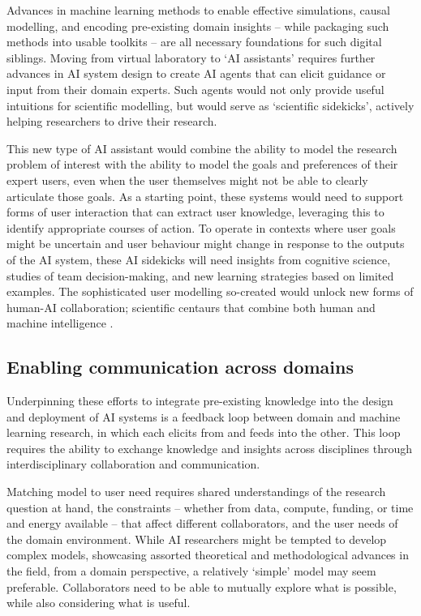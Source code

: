 Advances in machine learning methods to enable effective simulations,
causal modelling, and encoding pre-existing domain insights -- while
packaging such methods into usable toolkits -- are all necessary
foundations for such digital siblings. Moving from virtual laboratory to
`AI assistants' requires further advances in AI system design to create
AI agents that can elicit guidance or input from their domain experts.
Such agents would not only provide useful intuitions for scientific
modelling, but would serve as `scientific sidekicks', actively helping
researchers to drive their research.

This new type of AI assistant would combine the ability to model the
research problem of interest with the ability to model the goals and
preferences of their expert users, even when the user themselves might
not be able to clearly articulate those goals. As a starting point,
these systems would need to support forms of user interaction that can
extract user knowledge, leveraging this to identify appropriate courses
of action. To operate in contexts where user goals might be uncertain
and user behaviour might change in response to the outputs of the AI
system, these AI sidekicks will need insights from cognitive science,
studies of team decision-making, and new learning strategies based on
limited examples. The sophisticated user modelling so-created would
unlock new forms of human-AI collaboration; scientific centaurs that
combine both human and machine intelligence \cite{Celikok-best22}.

\subsection{Enabling communication across
domains}\label{enabling-communication-across-domains}

Underpinning these efforts to integrate pre-existing knowledge into the
design and deployment of AI systems is a feedback loop between domain
and machine learning research, in which each elicits from and feeds into
the other. This loop requires the ability to exchange knowledge and
insights across disciplines through interdisciplinary collaboration and
communication.

Matching model to user need requires shared understandings of the
research question at hand, the constraints -- whether from data,
compute, funding, or time and energy available -- that affect different
collaborators, and the user needs of the domain environment. While AI
researchers might be tempted to develop complex models, showcasing
assorted theoretical and methodological advances in the field, from a
domain perspective, a relatively `simple' model may seem preferable.
Collaborators need to be able to mutually explore what is possible,
while also considering what is useful.

